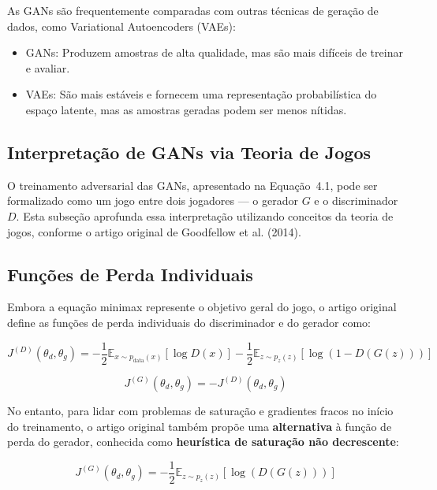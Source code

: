 \documentclass{tufte-handout}
\let\subsubsection\subsection
\begin{document}
As GANs são frequentemente comparadas com outras técnicas de geração de dados, como Variational Autoencoders (VAEs):
\begin{itemize}
    \item GANs: Produzem amostras de alta qualidade, mas são mais difíceis de treinar e avaliar.
    \item VAEs: São mais estáveis e fornecem uma representação probabilística do espaço latente, mas as amostras geradas podem ser menos nítidas.
\end{itemize}

\subsection{Interpretação de GANs via Teoria de Jogos}

O treinamento adversarial das GANs, apresentado na Equação~4.1, pode ser formalizado como um jogo entre dois jogadores --- o gerador $G$ e o discriminador $D$. Esta subseção aprofunda essa interpretação utilizando conceitos da teoria de jogos, conforme o artigo original de Goodfellow et al. (2014).

\subsubsection{Funções de Perda Individuais}

Embora a equação minimax represente o objetivo geral do jogo, o artigo original define as funções de perda individuais do discriminador e do gerador como:

\begin{equation}
    J^{(D)}(\theta_d, \theta_g) = - \frac{1}{2} \mathbb{E}_{x \sim p_{\text{data}}(x)} \left[ \log D(x) \right] - \frac{1}{2} \mathbb{E}_{z \sim p_z(z)} \left[ \log (1 - D(G(z))) \right]
\end{equation}

\begin{equation}
    J^{(G)}(\theta_d, \theta_g) = - J^{(D)}(\theta_d, \theta_g)
\end{equation}

No entanto, para lidar com problemas de saturação e gradientes fracos no início do treinamento, o artigo original também propõe uma \textbf{alternativa} à função de perda do gerador, conhecida como \textbf{heurística de saturação não decrescente}:

\begin{equation}
    J^{(G)}(\theta_d, \theta_g) = - \frac{1}{2} \mathbb{E}_{z \sim p_z(z)} \left[ \log (D(G(z))) \right]
\end{equation}
\end{document}
